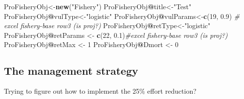 \documentclass[
]{book}
\newenvironment{Shaded}{\begin{snugshade}}{\end{snugshade}}
\newcommand{\CommentTok}[1]{\textcolor[rgb]{0.56,0.35,0.01}{\textit{#1}}}
\newcommand{\DecValTok}[1]{\textcolor[rgb]{0.00,0.00,0.81}{#1}}
\newcommand{\FloatTok}[1]{\textcolor[rgb]{0.00,0.00,0.81}{#1}}
\newcommand{\FunctionTok}[1]{\textcolor[rgb]{0.13,0.29,0.53}{\textbf{#1}}}
\newcommand{\NormalTok}[1]{#1}
\newcommand{\OtherTok}[1]{\textcolor[rgb]{0.56,0.35,0.01}{#1}}
\newcommand{\SpecialCharTok}[1]{\textcolor[rgb]{0.81,0.36,0.00}{\textbf{#1}}}
\newcommand{\StringTok}[1]{\textcolor[rgb]{0.31,0.60,0.02}{#1}}
\begin{document}
\begin{Shaded}
\begin{Highlighting}[]
\NormalTok{ProFisheryObj}\OtherTok{\textless{}{-}}\FunctionTok{new}\NormalTok{(}\StringTok{"Fishery"}\NormalTok{)}
\NormalTok{ProFisheryObj}\SpecialCharTok{@}\NormalTok{title}\OtherTok{\textless{}{-}}\StringTok{"Test"}
\NormalTok{ProFisheryObj}\SpecialCharTok{@}\NormalTok{vulType}\OtherTok{\textless{}{-}}\StringTok{"logistic"}
\NormalTok{ProFisheryObj}\SpecialCharTok{@}\NormalTok{vulParams}\OtherTok{\textless{}{-}}\FunctionTok{c}\NormalTok{(}\DecValTok{19}\NormalTok{, }\FloatTok{0.9}\NormalTok{) }\CommentTok{\# excel fishery{-}base row3 (is proj?)}
\NormalTok{ProFisheryObj}\SpecialCharTok{@}\NormalTok{retType}\OtherTok{\textless{}{-}}\StringTok{"logistic"}
\NormalTok{ProFisheryObj}\SpecialCharTok{@}\NormalTok{retParams }\OtherTok{\textless{}{-}} \FunctionTok{c}\NormalTok{(}\DecValTok{22}\NormalTok{, }\FloatTok{0.1}\NormalTok{)}\CommentTok{\#excel fishery{-}base row3 (is proj?)}
\NormalTok{ProFisheryObj}\SpecialCharTok{@}\NormalTok{retMax }\OtherTok{\textless{}{-}} \DecValTok{1}
\NormalTok{ProFisheryObj}\SpecialCharTok{@}\NormalTok{Dmort }\OtherTok{\textless{}{-}} \DecValTok{0}
\end{Highlighting}
\end{Shaded}

\subsection{The management strategy}\label{the-management-strategy-1}

Trying to figure out how to implement the 25\% effort reduction?
\end{document}
